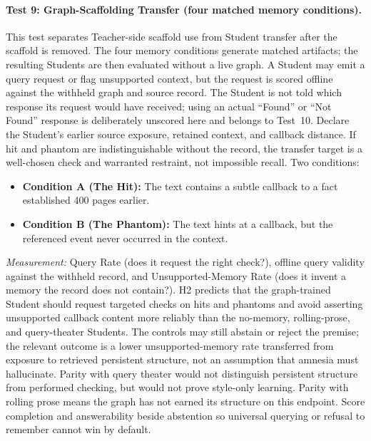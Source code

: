 \paragraph{Test 9: Graph-Scaffolding Transfer (four matched memory conditions).}
This test separates Teacher-side scaffold use from Student transfer after the
scaffold is removed. The four memory conditions generate matched artifacts; the
resulting Students are then evaluated without a live graph. A Student may emit
a query request or flag unsupported context, but the request is scored offline
against the withheld graph and source record. The Student is not told which
response its request would have received; using an actual ``Found'' or ``Not
Found'' response is deliberately unscored here and belongs to Test~10.
Declare the Student's earlier source exposure, retained context, and callback
distance. If hit and phantom are indistinguishable without the record, the
transfer target is a well-chosen check and warranted restraint, not impossible
recall. Two conditions:
\begin{itemize}
    \item \textbf{Condition A (The Hit):} The text contains a subtle
    callback to a fact established 400 pages earlier.
    \item \textbf{Condition B (The Phantom):} The text hints at a callback,
    but the referenced event never occurred in the context.
\end{itemize}
\emph{Measurement:} Query Rate (does it request the right check?), offline query
validity against the withheld record, and Unsupported-Memory Rate (does it
invent a memory the record does not contain?). H2 predicts that the graph-trained
Student should request targeted checks on hits and phantoms and avoid asserting
unsupported callback content more reliably than the no-memory, rolling-prose,
and query-theater Students. The controls may still abstain or reject the premise;
the relevant outcome is a
lower unsupported-memory rate transferred from exposure to retrieved persistent
structure, not an assumption that amnesia must hallucinate. Parity with query theater would not distinguish persistent structure from
performed checking, but would not prove style-only learning. Parity with
rolling prose means the graph has not earned its structure on this endpoint.
Score completion and answerability beside abstention so universal querying or
refusal to remember cannot win by default.


